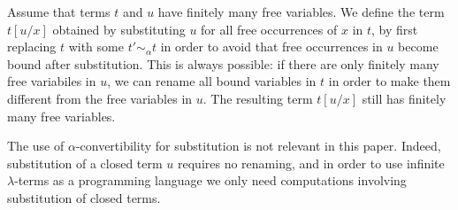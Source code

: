 %
%
%
%
%




Assume that terms $t$ and $u$ have finitely many free variables. 
We define the term $t[u/x]$ obtained by substituting $u$ for all free occurrences of $x$ in $t$, 
by first replacing $t$ with some $t' \sim_\alpha t$
in order to avoid that free occurrences in $u$ become bound after substitution. 
This is always possible: if there are only finitely many free variabiles in $u$, we can
rename all bound variables in $t$ in order to make them different from the free variables
in $u$. The resulting term $t[u/x]$ still has finitely many free variables.

The use of $\alpha$-convertibility for substitution is not relevant in this paper. Indeed,
substitution of a closed term $u$ requires no renaming, and  in order to use 
infinite $\lambda$-terms as a programming language we only need computations 
involving substitution of closed terms. 

